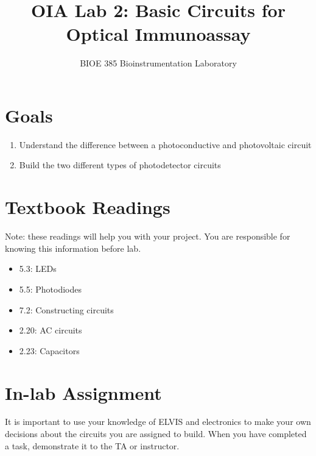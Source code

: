 \documentclass{article}
\title{OIA Lab 2: Basic Circuits for Optical Immunoassay}
\author{BIOE 385 Bioinstrumentation Laboratory}
\date{}
\begin{document}
\large
\maketitle

\section*{Goals}
\begin{enumerate}
	\item Understand the difference between a photoconductive and photovoltaic circuit
	\item Build the two different types of photodetector circuits
\end{enumerate}

\section*{Textbook Readings}
Note: these readings will help you with your project.  You are responsible for knowing this information before lab.
\begin{itemize}
	\item 5.3: LEDs
	\item 5.5: Photodiodes
	\item 7.2: Constructing circuits
	\item 2.20: AC circuits
	\item 2.23: Capacitors
\end{itemize}

\section*{In-lab Assignment}
It is important to use your knowledge of ELVIS and electronics to make your own decisions about the circuits you are assigned to build. When you have completed a task, demonstrate it to the TA or instructor.
\end{document}
